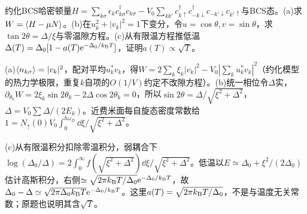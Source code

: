 \begin{exercise}[原题1(a)--(c)]
约化BCS哈密顿量$H=\sum_{k\sigma}\epsilon_kc_{k\sigma}^\dagger c_{k\sigma}-V_0\sum_{kk'}c_{k\uparrow}^\dagger c_{-k\downarrow}^\dagger c_{-k'\downarrow}c_{k'\uparrow}$与BCS态。(a)求$W=\langle H-\mu N\rangle$。(b)在$u_k^2+|v_k|^2=1$下变分，令$u=\cos\theta,v=\sin\theta$，求$\tan2\theta=\Delta/\xi$与零温隙方程。(c)从有限温方程推低温$\Delta(T)=\Delta_0[1-a(T)\mathrm e^{-\Delta_0/k_{\mathrm B} T}]$，证明$a(T)\propto\sqrt T$。
\end{exercise}
\begin{solution}
(a)$\langle n_{k\sigma}\rangle=|v_k|^2$，配对平均$u_k^*v_k$，得$W=2\sum_k\xi_k|v_k|^2-V_0|\sum_ku_k^*v_k|^2$（约化模型的热力学极限，重复$k$自项的$O(1/V)$约定不改隙方程）。(b)统一相位令$\Delta$实，$\partial_{\theta_k}W=2\xi_k\sin2\theta_k-2\Delta\cos2\theta_k=0$，所以$\sin2\theta=\Delta/\sqrt{\xi^2+\Delta^2}$，$\Delta=V_0\sum\Delta/(2E_k)$。近费米面每自旋态密度常数给$1=N_\uparrow(0)V_0\int_0^{\hbar\omega_D}\dd\xi/\sqrt{\xi^2+\Delta^2}$。

(c)从有限温积分扣除零温积分，弱耦合下$\log(\Delta_0/\Delta)=2\int_0^\infty f(\sqrt{\xi^2+\Delta^2})\dd\xi/\sqrt{\xi^2+\Delta^2}$。低温以$E\simeq\Delta_0+\xi^2/(2\Delta_0)$估计高斯积分，右侧$\simeq\sqrt{2\pi k_{\mathrm B} T/\Delta_0}\mathrm e^{-\Delta_0/k_{\mathrm B} T}$，故
$\Delta_0-\Delta\simeq\sqrt{2\pi\Delta_0k_{\mathrm B} T}\mathrm e^{-\Delta_0/k_{\mathrm B} T}$。这里$a(T)=\sqrt{2\pi k_{\mathrm B} T/\Delta_0}$，不是与温度无关常数；原题也说明其含$\sqrt T$。
\end{solution}
